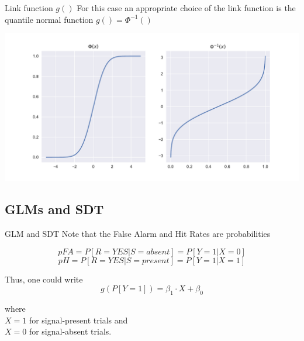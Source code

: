 \documentclass[10pt]{beamer}
\begin{document}
\begin{frame}{Link function $g()$}
For this case an appropriate choice of the link function is the quantile normal function $g() = \Phi^{-1}()$

\begin{center}
\includegraphics[scale=0.5]{figs/linkfun.pdf}
\end{center}

\end{frame}


\subsection{GLMs and SDT}
%
\begin{frame}{GLM and SDT}
Note that the False Alarm and Hit Rates are probabilities

$$ pFA = P[R=YES| S=absent] = P[Y=1 | X=0] $$
$$ pH =P[R=YES | S=present] = P[Y=1 | X=1] $$

Thus, one could write 
$$g(P[Y=1]) = \beta_1 \cdot X + \beta_0 $$

\hfill where \\
\hfill $X=1$ for signal-present trials and \\
\hfill $X=0$ for signal-absent trials.

\end{frame}
\end{document}
